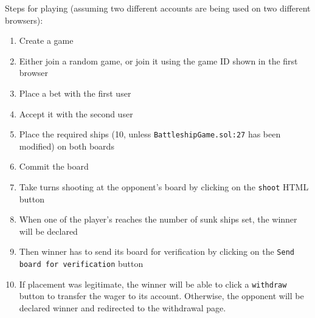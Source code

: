 Steps for playing (assuming two different accounts are being used on two
different browsers):
\begin{enumerate}
	\item Create a game
	\item Either join a random game, or join it using the game ID shown in the first
	      browser
	\item Place a bet with the first user
	\item Accept it with the second user
	\item Place the required ships (10, unless \texttt{BattleshipGame.sol:27}
	      has been modified) on both boards
	\item Commit the board
	\item Take turns shooting at the opponent's board by clicking on the
	      \texttt{shoot} HTML button
	\item When one of the player's reaches the number of sunk ships set, the winner will
	      be declared
	\item Then winner has to send its board for verification by clicking on the
	      \texttt{Send board for verification} button
	\item If placement was legitimate, the winner will be able to click a
	      \texttt{withdraw} button to transfer the wager to its account.
	      Otherwise, the opponent will be declared winner and redirected to the
	      withdrawal page.
\end{enumerate}

